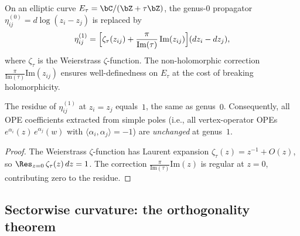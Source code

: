 On an elliptic curve $E_\tau = \bC/(\bZ + \tau\bZ)$, the genus-$0$
propagator $\eta_{ij}^{(0)} = d\log(z_i - z_j)$ is replaced by
\[
\eta_{ij}^{(1)} = \Bigl[
\zeta_\tau(z_{ij}) + \frac{\pi}{\mathrm{Im}(\tau)}\,\mathrm{Im}(z_{ij})
\Bigr](dz_i - dz_j),
\]
where $\zeta_\tau$ is the Weierstrass $\zeta$-function. The non-holomorphic
correction $\frac{\pi}{\mathrm{Im}(\tau)}\mathrm{Im}(z_{ij})$ ensures
well-definedness on $E_\tau$ at the cost of breaking holomorphicity.

\begin{proposition}\label{prop:lattice:genus1-simple-pole}
The residue of $\eta_{ij}^{(1)}$ at $z_i = z_j$ equals~$1$, the same as
genus~$0$. Consequently, all OPE coefficients extracted from simple poles
(i.e., all vertex-operator OPEs
$e^{\alpha_i}(z)\,e^{\alpha_j}(w)$ with $\langle\alpha_i,\alpha_j\rangle = -1$)
are \emph{unchanged} at genus~$1$.
\end{proposition}
\begin{proof}
The Weierstrass $\zeta$-function has Laurent expansion
$\zeta_\tau(z) = z^{-1} + O(z)$, so $\Res_{z=0}\,\zeta_\tau(z)\,dz = 1$.
The correction $\frac{\pi}{\mathrm{Im}(\tau)}\mathrm{Im}(z)$ is regular
at $z = 0$, contributing zero to the residue.
\end{proof}

\subsection{Sectorwise curvature: the orthogonality theorem}

